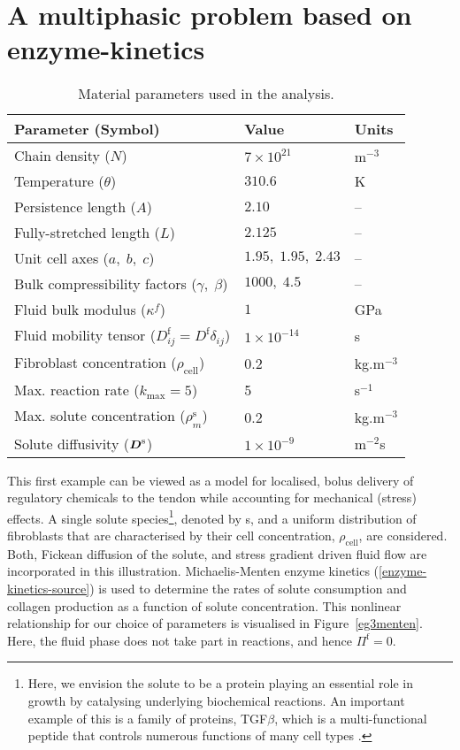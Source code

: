 \section{A multiphasic problem based on enzyme-kinetics}
\label{enzyme-kinetics-example}

\begin{table}
\centering
\begin{tabular}{|l|l|l|}
\hline Parameter (Symbol) & Value & Units\\ \hline \hline Chain
density ($N$) & $7\times 10^{21}$ & $\mathrm{m}^{-3}$\\ Temperature
($\theta$) & $310.6$ & K\\ Persistence length ($A$) & $2.10$ &
--\\ Fully-stretched length ($L$) & $2.125$ & --\\ Unit cell axes
($a,\;b,\;c$) & $1.95,\;1.95,\;2.43$ & --\\ Bulk compressibility
factors ($\gamma,\;\beta$) & $1000,\; 4.5$ & --\\ Fluid bulk modulus
($\kappa^f$) & $1$ & GPa\\ Fluid mobility tensor ($D^\mathrm{f}_{ij} =
D^\mathrm{f}\delta_{ij}$) & $1\times 10^{-14}$ &s\\ Fibroblast
concentration ($\rho_{\mathrm{cell}}$) & 0.2 &
kg.m$^{-3}$\\ Max. reaction rate ($k_{\mathrm{max}} = 5$) & 5 &
s$^{-1}$\\ Max. solute concentration ($\rho^{\mathrm{s}}_m$) & 0.2 &
kg.m$^{-3}$\\ Solute diffusivity ($\mbox{\boldmath$ D$}^\mathrm{s}$) & $1\times
10^{-9}$ & m$^{-2}$s\\ \hline
\end{tabular}
\caption{Material parameters used in the analysis.}
\label{parameters}
\end{table}

This first example can be viewed as a model for localised, bolus
delivery of regulatory chemicals to the tendon while accounting for
mechanical (stress) effects. A single solute species\footnote{Here, we
  envision the solute to be a protein playing an essential role in
  growth by catalysing underlying biochemical reactions. An important
  example of this is a family of proteins, TGF$\beta$, which is a
  multi-functional peptide that controls numerous functions of many
  cell types \citep{Alberts:02}.}, denoted by s, and a uniform
distribution of fibroblasts that are characterised by their cell
concentration, $\rho_{\mathrm{cell}}$, are considered. Both, Fickean
diffusion of the solute, and stress gradient driven fluid flow are
incorporated in this illustration. Michaelis-Menten enzyme kinetics
(\ref{enzyme-kinetics-source}) is used to determine the rates of
solute consumption and collagen production as a function of solute
concentration. This nonlinear relationship for our choice of
parameters is visualised in Figure~\ref{eg3menten}. Here, the fluid
phase does not take part in reactions, and hence $\Pi^\mathrm{f}=0$.

